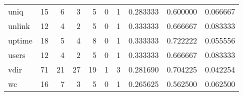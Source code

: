 \begin{longtable}{lrrrrrrrrr}
uniq      &                                      15 &                                                  6 &                                                  3 &                                                  5 &                                                  0 &                                                  1 &                                           0.283333 &                               0.600000 &                             0.066667 \\
unlink    &                                      12 &                                                  4 &                                                  2 &                                                  5 &                                                  0 &                                                  1 &                                           0.333333 &                               0.666667 &                             0.083333 \\
uptime    &                                      18 &                                                  5 &                                                  4 &                                                  8 &                                                  0 &                                                  1 &                                           0.333333 &                               0.722222 &                             0.055556 \\
users     &                                      12 &                                                  4 &                                                  2 &                                                  5 &                                                  0 &                                                  1 &                                           0.333333 &                               0.666667 &                             0.083333 \\
vdir      &                                      71 &                                                 21 &                                                 27 &                                                 19 &                                                  1 &                                                  3 &                                           0.281690 &                               0.704225 &                             0.042254 \\
wc        &                                      16 &                                                  7 &                                                  3 &                                                  5 &                                                  0 &                                                  1 &                                           0.265625 &                               0.562500 &                             0.062500 \\

\end{longtable}
